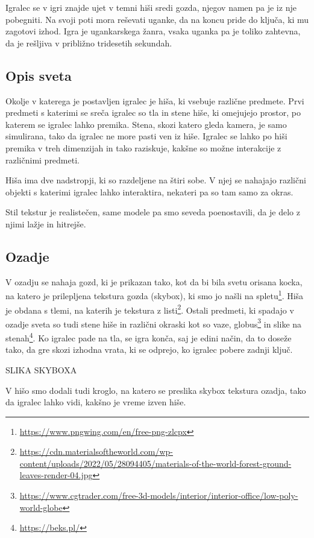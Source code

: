 \documentclass[a4paper,12pt]{article}
\begin{document}
\noindent Igralec se v igri znajde ujet v temni hiši sredi gozda, njegov namen pa je iz nje pobegniti. Na svoji poti mora reševati uganke, da na koncu pride do ključa, ki mu zagotovi izhod. Igra je ugankarskega žanra, vsaka uganka pa je toliko zahtevna, da je rešljiva v približno tridesetih sekundah.


\subsection{Opis sveta}
Okolje v katerega je postavljen igralec je hiša, ki vsebuje različne predmete. Prvi predmeti s katerimi se sreča igralec so tla in stene hiše, ki omejujejo prostor, po katerem se igralec lahko premika. Stena, skozi katero gleda kamera, je samo simulirana, tako da igralec ne more pasti ven iz hiše. Igralec se lahko po hiši premika v treh dimenzijah in tako raziskuje, kakšne so možne interakcije z različnimi predmeti.

Hiša ima dve nadstropji, ki so razdeljene na štiri sobe. V njej se nahajajo različni objekti s katerimi igralec lahko interaktira, nekateri pa so tam samo za okras.

Stil tekstur je realistečen, same modele pa smo seveda poenostavili, da je delo z njimi lažje in hitrejše. 


\subsection{Ozadje}
\noindent  V ozadju se nahaja gozd, ki je prikazan tako, kot da bi bila svetu orisana kocka, na katero je prilepljena tekstura gozda (skybox), ki smo jo našli na spletu\footnote{\url{https://www.pngwing.com/en/free-png-zlcpx}}. Hiša je obdana s tlemi, na katerih je tekstura z listi\footnote{\url{https://cdn.materialsoftheworld.com/wp-content/uploads/2022/05/28094405/materials-of-the-world-forest-ground-leaves-render-04.jpg}}. Ostali predmeti, ki spadajo v ozadje sveta so tudi stene hiše in različni okraski kot so vaze, globus\footnote{\url{https://www.cgtrader.com/free-3d-models/interior/interior-office/low-poly-world-globe}} in slike na stenah\footnote{\url{https://beks.pl/}}. Ko igralec pade na tla, se igra konča, saj je edini način, da to doseže tako, da gre skozi izhodna vrata, ki se odprejo, ko igralec pobere zadnji ključ.

SLIKA SKYBOXA

V hišo smo dodali tudi kroglo, na katero se preslika skybox tekstura ozadja, tako da igralec lahko vidi, kakšno je vreme izven hiše.
\end{document}
